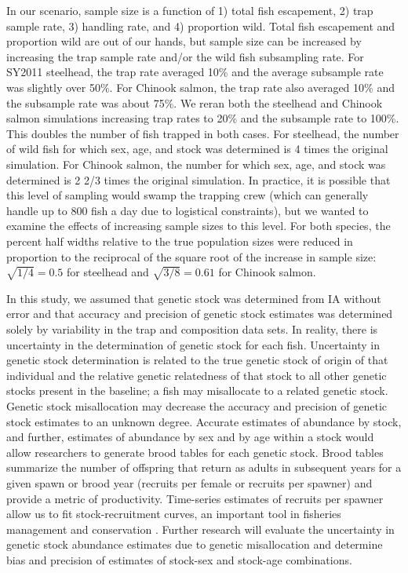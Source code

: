 \documentclass[%
                leqno,         %
%
]{nrc1}                          %
\begin{document}
In our scenario, sample size is a function of 1) total fish escapement, 2) trap sample rate, 3) handling rate, and 4) proportion wild. Total fish escapement and proportion wild are out of our hands, but sample size can be increased by increasing the trap sample rate and/or the wild fish subsampling rate. For SY2011 steelhead, the trap rate averaged 10\% and the average subsample rate was slightly over 50\%. For Chinook salmon, the trap rate also averaged 10\% and the subsample rate was about 75\%. We reran both the steelhead and Chinook salmon simulations increasing trap rates to 20\% and the subsample rate to 100\%. This doubles the number of fish trapped in both cases. For steelhead, the number of wild fish for which sex, age, and stock was determined is 4 times the original simulation. For Chinook salmon, the number for which sex, age, and stock was determined is 2 2/3 times the original simulation. In practice, it is possible that this level of sampling would swamp the trapping crew (which can generally handle up to 800 fish a day due to logistical constraints), but we wanted to examine the effects of increasing sample sizes to this level. For both species, the percent half widths relative to the true population sizes were reduced in proportion to the reciprocal of the square root of the increase in sample size: $\sqrt{1/4} = 0.5$ for steelhead and $\sqrt{3/8} = 0.61$  for Chinook salmon.

In this study, we assumed that genetic stock was determined from IA without error and that accuracy and precision of genetic stock estimates was determined solely by variability in the trap and composition data sets. In reality, there is uncertainty in the determination of genetic stock for each fish. Uncertainty in genetic stock determination is related to the true genetic stock of origin of that individual and the relative genetic relatedness of that stock to all other genetic stocks present in the baseline; a fish may misallocate to a related genetic stock. Genetic stock misallocation may decrease the accuracy and precision of genetic stock estimates to an unknown degree. Accurate estimates of abundance by stock, and further, estimates of abundance by sex and by age within a stock would allow researchers to generate brood tables for each genetic stock. Brood tables summarize the number of offspring that return as adults in subsequent years for a given spawn or brood year (recruits per female or recruits per spawner) and provide a metric of productivity. Time-series estimates of recruits per spawner allow us to fit stock-recruitment curves, an important tool in fisheries management and conservation \citep{Ricker1973,Hilborn2003}. Further research will evaluate the uncertainty in genetic stock abundance estimates due to genetic misallocation and determine bias and precision of estimates of stock-sex and stock-age combinations.
\end{document}
